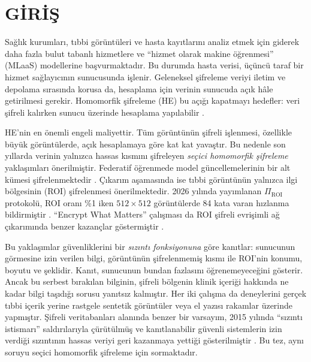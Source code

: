 \chapter{G\.IR\.I\c{S}}\label{giris}

Sağlık kurumları, tıbbi görüntüleri ve hasta kayıtlarını analiz etmek için giderek daha fazla bulut tabanlı hizmetlere ve ``hizmet olarak makine öğrenmesi'' (MLaaS) modellerine başvurmaktadır. Bu durumda hasta verisi, üçüncü taraf bir hizmet sağlayıcının sunucusunda işlenir. Geleneksel şifreleme veriyi iletim ve depolama sırasında korusa da, hesaplama için verinin sunucuda açık hâle getirilmesi gerekir. Homomorfik şifreleme (HE) bu açığı kapatmayı hedefler: veri şifreli kalırken sunucu üzerinde hesaplama yapılabilir \cite{gentry2009fhe,cheon2017ckks}.

HE'nin en önemli engeli maliyettir. Tüm görüntünün şifreli işlenmesi, özellikle büyük görüntülerde, açık hesaplamaya göre kat kat yavaştır. Bu nedenle son yıllarda verinin yalnızca hassas kısmını şifreleyen \emph{seçici homomorfik şifreleme} yaklaşımları önerilmiştir. Federatif öğrenmede model güncellemelerinin bir alt kümesi şifrelenmektedir \cite{hu2025maskcrypt,korkmaz2025fas,li2025sensecrypt}. Çıkarım aşamasında ise tıbbi görüntünün yalnızca ilgi bölgesinin (ROI) şifrelenmesi önerilmektedir. 2026 yılında yayımlanan $\Pi_{\mathrm{ROI}}$ protokolü, ROI oranı \%1 iken $512 \times 512$ görüntülerde 84 kata varan hızlanma bildirmiştir \cite{bakas2026roi}. ``Encrypt What Matters'' çalışması da ROI şifreli evrişimli ağ çıkarımında benzer kazançlar göstermiştir \cite{backour2026encrypt}.

Bu yaklaşımlar güvenliklerini bir \emph{sızıntı fonksiyonuna} göre kanıtlar: sunucunun görmesine izin verilen bilgi, görüntünün şifrelenmemiş kısmı ile ROI'nin konumu, boyutu ve şeklidir. Kanıt, sunucunun bundan fazlasını öğrenemeyeceğini gösterir. Ancak bu serbest bırakılan bilginin, şifreli bölgenin klinik içeriği hakkında ne kadar bilgi taşıdığı sorusu yanıtsız kalmıştır. Her iki çalışma da deneylerini gerçek tıbbi içerik yerine rastgele sentetik görüntüler veya el yazısı rakamlar üzerinde yapmıştır. Şifreli veritabanları alanında benzer bir varsayım, 2015 yılında ``sızıntı istismarı'' saldırılarıyla çürütülmüş ve kanıtlanabilir güvenli sistemlerin izin verdiği sızıntının hassas veriyi geri kazanmaya yettiği gösterilmiştir \cite{naveed2015inference,cash2015leakage}. Bu tez, aynı soruyu seçici homomorfik şifreleme için sormaktadır.

